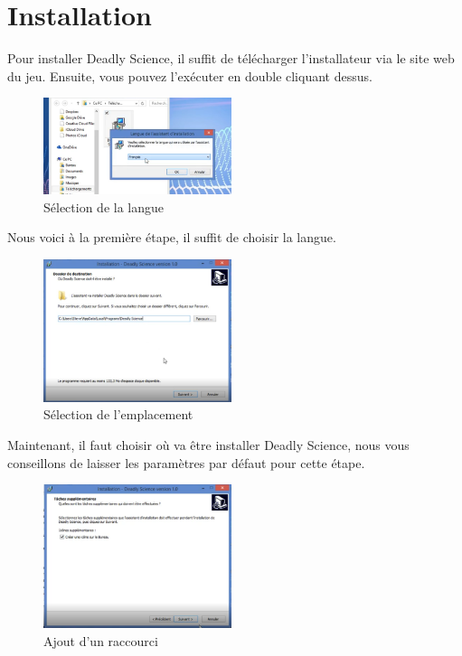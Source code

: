 \documentclass{article}
\begin{document}
\tableofcontents

\newpage
\section{Installation}

Pour installer Deadly Science, il suffit de télécharger l'installateur via le site web du jeu. Ensuite, vous pouvez l'exécuter en double cliquant dessus.

\begin{figure}[H]
	\centering
	\includegraphics[width=0.49\textwidth]{setup/inst_1.png}
	\caption{Sélection de la langue}
	\label{setup_0}
\end{figure}

Nous voici à la première étape, il suffit de choisir la langue.

\begin{figure}[H]
	\centering
	\includegraphics[width=0.49\textwidth]{setup/inst_2.png}
	\caption{Sélection de l'emplacement}
	\label{setup_1}
\end{figure}

Maintenant, il faut choisir où va être installer Deadly Science, nous vous conseillons de laisser les paramètres par défaut pour cette étape.

\begin{figure}[H]
	\centering
	\includegraphics[width=0.49\textwidth]{setup/inst_3.png}
	\caption{Ajout d'un raccourci}
	\label{setup_2}
\end{figure}
\end{document}
